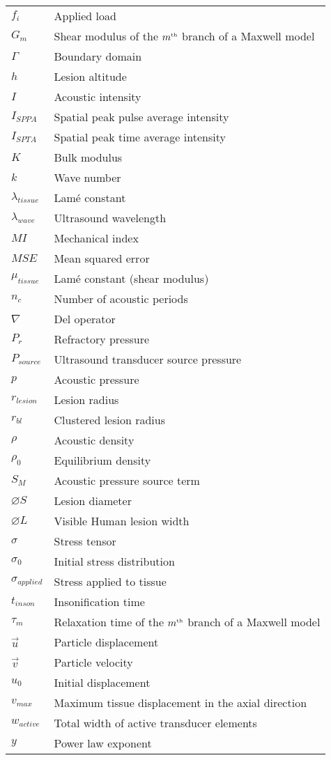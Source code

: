 \begin{longtable}[l]{ll}
			$f_i$ & Applied load \\
			$G_m$ & Shear modulus of the $m^{\text{\tiny th}}$ branch of a Maxwell model \\
			$\Gamma$ & Boundary domain \\
			$h$ & Lesion altitude \\
			$I$ & Acoustic intensity \\
			$I_{SPPA}$ & Spatial peak pulse average intensity \\
			$I_{SPTA}$ & Spatial peak time average intensity \\
			$K$ & Bulk modulus \\
			$k$ & Wave number \\
			$\lambda_{tissue}$ & Lam\'{e} constant \\
			$\lambda_{wave}$ & Ultrasound wavelength \\
			$MI$ & Mechanical index \\
			$MSE$ & Mean squared error \\
			$\mu_{tissue}$ & Lam\'{e} constant (shear modulus) \\
			$n_c$ & Number of acoustic periods \\
			$\nabla$ & Del operator \\
			$P_r$ & Refractory pressure \\
			$P_{source}$ & Ultrasound transducer source pressure \\
			$p$ & Acoustic pressure \\
			$r_{lesion}$ & Lesion radius \\
			$r_{bl}$ & Clustered lesion radius \\
			$\rho$ & Acoustic density \\
			$\rho_0$ & Equilibrium density \\
			$S_M$ & Acoustic pressure source term \\
			$\diameter S$ & Lesion diameter \\
			$\diameter L$ & Visible Human lesion width \\
			$\sigma$ & Stress tensor \\
			$\sigma_0$ & Initial stress distribution \\
			$\sigma_{applied}$ & Stress applied to tissue \\
			$t_{inson}$ & Insonification time \\
			$\tau_m$ & Relaxation time of the $m^{\text{\tiny th}}$ branch of a Maxwell model \\
			$\vec{u}$ & Particle displacement \\
			$\vec{v}$ & Particle velocity \\
			$u_0$ & Initial displacement \\
			$v_{max}$ & Maximum tissue displacement in the axial direction \\
			$w_{active}$ & Total width of active transducer elements \\
			$y$ & Power law exponent \\
		\end{longtable}

